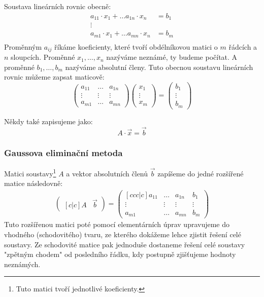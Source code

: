 Soustava lineárních rovnic obecně:
\begin{align*}
    a_{11} \cdot x_1 + \ldots a_{1n} \cdot x_n &= b_1\\
    \vdots\\
    a_{m1} \cdot x_1 + \ldots a_{mn} \cdot x_n &= b_m\\
\end{align*}
Proměnným $a_{ij}$ říkáme koeficienty, které tvoří obdélníkovou matici
o $m$ řádcích a $n$ sloupcích. Proměnné $x_1, \ldots, x_n$ nazýváme neznámé, ty budeme
počítat. A proměnné $b_1, \ldots, b_m$ nazýváme absolutní členy.
Tuto obecnou soustavu lineárních rovnic můžeme zapsat maticově:
\[
    \begin{pmatrix}
        a_{11} & \ldots & a_{1n} \\
        \vdots & \vdots & \vdots\\
        a_{m1} & \ldots & a_{mn}
    \end{pmatrix}
    \begin{pmatrix}
        x_1 \\
        \vdots \\
        x_m
    \end{pmatrix}
    =
    \begin{pmatrix}
        b_1 \\
        \vdots \\
        b_m
    \end{pmatrix}
\]

Někdy také zapisujeme jako:
$$A \cdot \vec{x} = \vec{b}$$

\subsubsection{Gaussova eliminační metoda}
Matici soustavy\footnote{Tuto matici tvoří jednotlivé koeficienty.} $A$ a vektor absolutních členů
$\vec{b}$ zapíšeme do jedné rozšířené matice následovně:
\begin{align*}
    \begin{pmatrix}[c|c]
        A & \vec{b}
    \end{pmatrix} =
    \begin{pmatrix}[ccc|c]
        a_{11} & \ldots & a_{1n} & b_1\\
        \vdots & \vdots & \vdots & \vdots \\
        a_{m1} & \ldots & a_{mn} & b_m
    \end{pmatrix}
\end{align*}
Tuto rozšířenou matici poté pomocí elementárních úprav upravujeme do vhodného (schodovitého) tvaru,
ze kterého dokážeme lehce zjistit řešení celé soustavy. Ze schodovité matice pak jednoduše dostaneme
řešení celé soustavy "zpětným chodem" od posledního řádku, kdy postupně zjišťujeme hodnoty neznámých.

